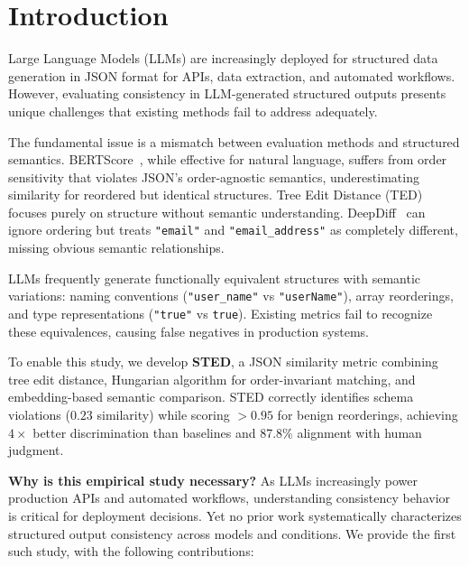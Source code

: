 \documentclass{article}
\theoremstyle{plain}
\theoremstyle{definition}
\begin{document}
\section{Introduction}

Large Language Models (LLMs) are increasingly deployed for structured data generation in JSON format for APIs, data extraction, and automated workflows. However, evaluating consistency in LLM-generated structured outputs presents unique challenges that existing methods fail to address adequately.

The fundamental issue is a mismatch between evaluation methods and structured semantics. BERTScore~\cite{Zhang2020}, while effective for natural language, suffers from order sensitivity that violates JSON's order-agnostic semantics, underestimating similarity for reordered but identical structures. Tree Edit Distance (TED) focuses purely on structure without semantic understanding. DeepDiff~\cite{seperman} can ignore ordering but treats \texttt{"email"} and \texttt{"email\_address"} as completely different, missing obvious semantic relationships.

LLMs frequently generate functionally equivalent structures with semantic variations: naming conventions (\texttt{"user\_name"} vs \texttt{"userName"}), array reorderings, and type representations (\texttt{"true"} vs \texttt{true}). Existing metrics fail to recognize these equivalences, causing false negatives in production systems.

To enable this study, we develop \textbf{STED}, a JSON similarity metric combining tree edit distance, Hungarian algorithm for order-invariant matching, and embedding-based semantic comparison. STED correctly identifies schema violations ($0.23$ similarity) while scoring $>0.95$ for benign reorderings, achieving $4\times$ better discrimination than baselines and 87.8\% alignment with human judgment.

\textbf{Why is this empirical study necessary?} As LLMs increasingly power production APIs and automated workflows, understanding consistency behavior is critical for deployment decisions. Yet no prior work systematically characterizes structured output consistency across models and conditions. We provide the first such study, with the following contributions:
\end{document}
